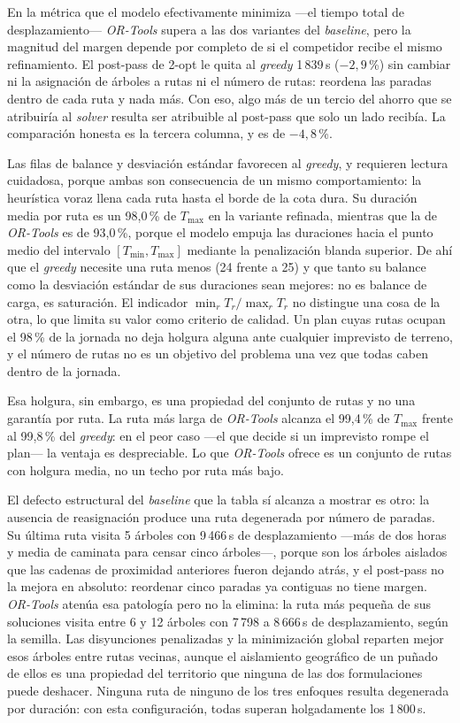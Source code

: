 En la métrica que el modelo efectivamente minimiza ---el tiempo total de
desplazamiento--- \textit{OR-Tools} supera a las dos variantes del
\textit{baseline}, pero la magnitud del margen depende por completo de si el
competidor recibe el mismo refinamiento. El post-pass de 2-opt le quita al
\textit{greedy} 1\,839\,s ($-2{,}9$\,\%) sin cambiar ni la asignación de árboles a
rutas ni el número de rutas: reordena las paradas dentro de cada ruta y nada
más. Con eso, algo más de un tercio del ahorro que se atribuiría al
\textit{solver} resulta ser atribuible al post-pass que solo un lado recibía. La
comparación honesta es la tercera columna, y es de $-4{,}8$\,\%.

Las filas de balance y desviación estándar favorecen al \textit{greedy}, y
requieren lectura cuidadosa, porque ambas son consecuencia de un mismo
comportamiento: la heurística voraz llena cada ruta hasta el borde de la cota
dura. Su duración media por ruta es un 98{,}0\,\% de $T_{\max}$ en la variante
refinada, mientras que la de \textit{OR-Tools} es de 93{,}0\,\%, porque el modelo
empuja las duraciones hacia el punto medio del intervalo
$[T_{\min}, T_{\max}]$ mediante la penalización blanda superior. De ahí que el
\textit{greedy} necesite una ruta menos (24 frente a 25) y que tanto su balance
como la desviación estándar de sus duraciones sean mejores: no es balance de
carga, es saturación. El indicador $\min_r T_r / \max_r T_r$ no distingue una
cosa de la otra, lo que limita su valor como criterio de calidad. Un plan cuyas
rutas ocupan el 98\,\% de la jornada no deja holgura alguna ante cualquier
imprevisto de terreno, y el número de rutas no es un objetivo del problema una
vez que todas caben dentro de la jornada.

Esa holgura, sin embargo, es una propiedad del conjunto de rutas y no una
garantía por ruta. La ruta más larga de \textit{OR-Tools} alcanza el 99{,}4\,\% de
$T_{\max}$ frente al 99{,}8\,\% del \textit{greedy}: en el peor caso ---el que
decide si un imprevisto rompe el plan--- la ventaja es despreciable. Lo que
\textit{OR-Tools} ofrece es un conjunto de rutas con holgura media, no un techo
por ruta más bajo.

El defecto estructural del \textit{baseline} que la tabla sí alcanza a mostrar es
otro: la ausencia de reasignación produce una ruta degenerada por número de
paradas. Su última ruta visita 5 árboles con 9\,466\,s de desplazamiento ---más de
dos horas y media de caminata para censar cinco árboles---, porque son los
árboles aislados que las cadenas de proximidad anteriores fueron dejando atrás,
y el post-pass no la mejora en absoluto: reordenar cinco paradas ya contiguas no
tiene margen. \textit{OR-Tools} atenúa esa patología pero no la elimina: la ruta
más pequeña de sus soluciones visita entre 6 y 12 árboles con 7\,798 a 8\,666\,s
de desplazamiento, según la semilla. Las disyunciones penalizadas y la
minimización global reparten mejor esos árboles entre rutas vecinas, aunque el
aislamiento geográfico de un puñado de ellos es una propiedad del territorio que
ninguna de las dos formulaciones puede deshacer. Ninguna ruta de ninguno de los
tres enfoques resulta degenerada por duración: con esta configuración, todas
superan holgadamente los 1\,800\,s.

